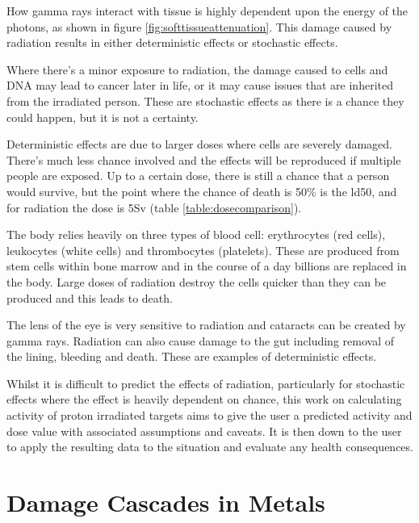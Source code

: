 How gamma rays interact with tissue is highly dependent upon the energy of the photons, as shown in figure \ref{fig:softtissueattenuation}.  This damage caused by radiation results in either deterministic effects or stochastic effects.  

Where there's a minor exposure to radiation, the damage caused to cells and DNA may lead to cancer later in life, or it may cause issues that are inherited from the irradiated person.  These are stochastic effects as there is a chance they could happen, but it is not a certainty.

Deterministic effects are due to larger doses where cells are severely damaged.  There's much less chance involved and the effects will be reproduced if multiple people are exposed.  Up to a certain dose, there is still a chance that a person would survive, but the point where the chance of death is 50\% is the \gls{ld50}, and for radiation the dose is 5Sv (table \ref{table:dosecomparison}).

The body relies heavily on three types of blood cell: erythrocytes (red cells), leukocytes (white cells) and thrombocytes (platelets).  These are produced from stem cells within bone marrow and in the course of a day billions are replaced in the body.  Large doses of radiation destroy the cells quicker than they can be produced and this leads to death.  

The lens of the eye is very sensitive to radiation and cataracts can be created by gamma rays.  Radiation can also cause damage to the gut including removal of the lining, bleeding and death.  These are examples of deterministic  effects.

Whilst it is difficult to predict the effects of radiation, particularly for stochastic effects where the effect is heavily dependent on chance, this work on calculating activity of proton irradiated targets aims to give the user a predicted activity and dose value with associated assumptions and caveats.  It is then down to the user to apply the resulting data to the situation and evaluate any health consequences.





\FloatBarrier

\section{Damage Cascades in Metals}

